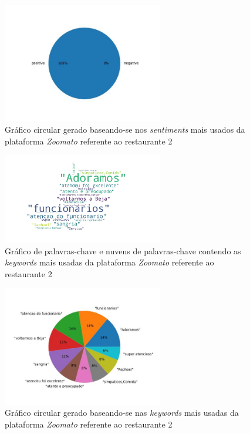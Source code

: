 \begin{figure}[!htb]
\centering
\includegraphics[width=7cm]{figuras/Zoomato/Restaurants/restaurante2_sentiments.jpeg}
\caption{Gráfico circular gerado baseando-se nos \textit{sentiments} mais usados da plataforma \textit{Zoomato} referente ao restaurante 2}
\label{fig:exemplofig}
\end{figure}

\begin{figure}[!htb]
\centering
\includegraphics[width=7cm]{figuras/Zoomato/Restaurants/restaurante2_keywordcloud.jpeg}
\caption{Gráfico de palavras-chave e nuvens de palavras-chave contendo as \textit{keywords} mais usadas da plataforma \textit{Zoomato} referente ao restaurante 2}
\label{fig:exemplofig}
\end{figure}

\begin{figure}[!htb]
\centering
\includegraphics[width=7cm]{figuras/Zoomato/Restaurants/restaurante2_keywords.jpeg}
\caption{Gráfico circular gerado baseando-se nas \textit{keywords} mais usadas da plataforma \textit{Zoomato} referente ao restaurante 2}
\label{fig:exemplofig}
\end{figure}

